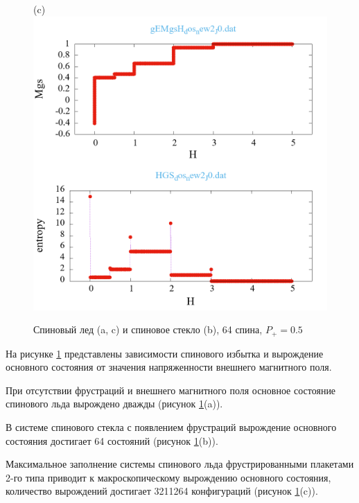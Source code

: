 \documentclass[utf8, babel, sor, jor, amsmath, amssymb, reprint]{elsarticle} %
\begin{document}
\begin{figure}[H]
\begin{minipage}[h]{0.32\linewidth}
	\end{minipage}
	\hfill
	\begin{minipage}[h]{0.32\linewidth}
		\centering(c)
		\includegraphics[width=1\linewidth]{pictures/_multiplot_SI64_J0}
	\end{minipage}
	
	\caption{Спиновый лед (a, c) и спиновое стекло (b), 64 спина, $P_+ = 0.5$}
	\label{fig:_multiplot_SI_SG_64}
	
\end{figure}


На рисунке \ref{fig:_multiplot_SI_SG_64} представлены зависимости спинового избытка и вырождение основного состояния от значения напряженности внешнего магнитного поля. 

При отсутствии фрустраций и внешнего магнитного поля основное состояние спинового льда вырождено дважды (рисунок \ref{fig:_multiplot_SI_SG_64}(a)).

В системе спинового стекла с появлением фрустраций вырождение основного состояния достигает 64 состояний (рисунок \ref{fig:_multiplot_SI_SG_64}(b)).

Максимальное заполнение системы спинового льда фрустрированными плакетами 2-го типа приводит к макроскопическому вырождению основного состояния, количество вырождений достигает 3211264 конфигураций (рисунок \ref{fig:_multiplot_SI_SG_64}(c)).
\end{document}
